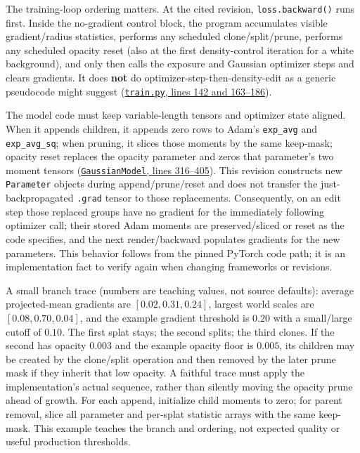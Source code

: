 The training-loop ordering matters. At the cited revision, \texttt{loss.backward()} runs first. Inside the no-gradient control block, the program accumulates visible gradient/radius statistics, performs any scheduled clone/split/prune, performs any scheduled opacity reset (also at the first density-control iteration for a white background), and only then calls the exposure and Gaussian optimizer steps and clears gradients. It does \textbf{not} do optimizer-step-then-density-edit as a generic pseudocode might suggest (\href{https://github.com/graphdeco-inria/gaussian-splatting/blob/54c035f7834b564019656c3e3fcc3646292f727d/train.py\#L142-L186}{\texttt{train.py}, lines 142 and 163--186}).

The model code must keep variable-length tensors and optimizer state aligned. When it appends children, it appends zero rows to Adam's \texttt{exp\_avg} and \texttt{exp\_avg\_sq}; when pruning, it slices those moments by the same keep-mask; opacity reset replaces the opacity parameter and zeros that parameter's two moment tensors (\href{https://github.com/graphdeco-inria/gaussian-splatting/blob/54c035f7834b564019656c3e3fcc3646292f727d/scene/gaussian_model.py\#L316-L405}{\texttt{GaussianModel}, lines 316--405}). This revision constructs new \texttt{Parameter} objects during append/prune/reset and does not transfer the just-backpropagated \texttt{.grad} tensor to those replacements. Consequently, on an edit step those replaced groups have no gradient for the immediately following optimizer call; their stored Adam moments are preserved/sliced or reset as the code specifies, and the next render/backward populates gradients for the new parameters. This behavior follows from the pinned PyTorch code path; it is an implementation fact to verify again when changing frameworks or revisions.

A small branch trace (numbers are teaching values, not source defaults): average projected-mean gradients are \([0.02,0.31,0.24]\), largest world scales are \([0.08,0.70,0.04]\), and the example gradient threshold is \(0.20\) with a small/large cutoff of \(0.10\). The first splat stays; the second splits; the third clones. If the second has opacity \(0.003\) and the example opacity floor is \(0.005\), its children may be created by the clone/split operation and then removed by the later prune mask if they inherit that low opacity. A faithful trace must apply the implementation's actual sequence, rather than silently moving the opacity prune ahead of growth. For each append, initialize child moments to zero; for parent removal, slice all parameter and per-splat statistic arrays with the same keep-mask. This example teaches the branch and ordering, not expected quality or useful production thresholds.

